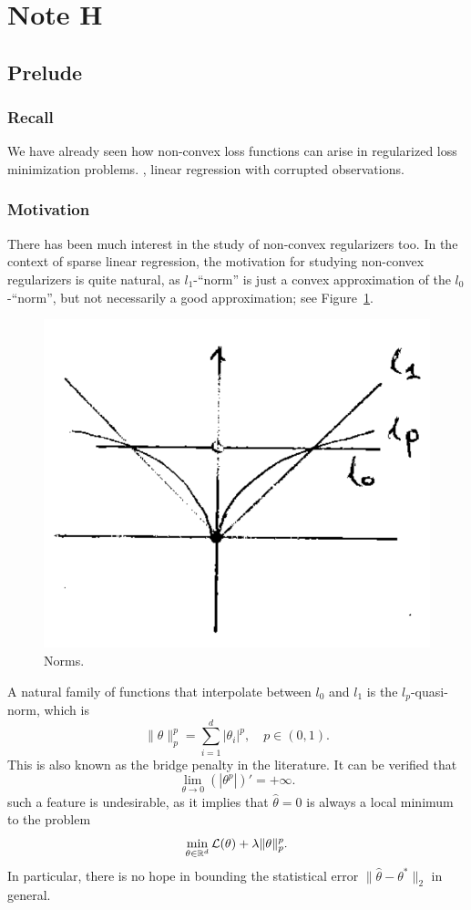 \clearpage
\section{Note H}

\subsection{Prelude}

\subsubsection{Recall}

We have already seen how non-convex loss functions can arise
in regularized loss minimization problems.
\eg, linear regression with corrupted observations.

\subsubsection{Motivation}

There has been much interest in the study of non-convex regularizers too.
In the context of sparse linear regression,
the motivation for studying non-convex regularizers is quite natural,
as $l_1$-``norm'' is just a convex approximation of the $l_0$-``norm'',
but not necessarily a good approximation; see Figure~\ref{fig:norms}.

\begin{figure}[ht]
\centering
    \includegraphics[width=0.32\linewidth]{fig/norms}
    \caption{\small Norms.}
    \label{fig:norms}
\end{figure}

A natural family of functions that interpolate between $l_0$ and $l_1$ is
the $l_p$-quasi-norm,
which is
\begin{equation}
    \|\theta\|_p^p=\sum_{i=1}^d|\theta_i|^p,\quad p\in(0,1).
\end{equation}
This is also known as the bridge penalty in the literature.
It can be verified that
\begin{equation}
    \lim_{\theta\to 0}(|\theta^p|)'=+\infty.
\end{equation}
such a feature is undesirable,
as it implies that $\hat\theta=0$ is always a local minimum to the problem
\begin{equation}
    \min_{\theta\in{\mathbb{R}}^d}\mathcal{L}(\theta)+\lambda\|\theta\|_p^p.
\end{equation}
In particular,
there is no hope in bounding the statistical error $\|\hat\theta-\theta^*\|_2$
in general.

